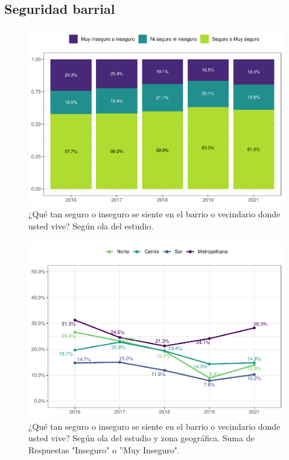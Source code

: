 \documentclass[
  12pt,
]{book}
\begin{document}
\hypertarget{seguridad-barrial}{%
\subsection{Seguridad barrial}\label{seguridad-barrial}}

\begin{figure}

{\centering \includegraphics{reporte-elsoc_files/figure-latex/seguri-ola-1} 

}

\caption{¿Qué tan seguro o inseguro se siente en el barrio o vecindario donde usted vive? Según ola del estudio.}\label{fig:seguri-ola}
\end{figure}

\begin{figure}

{\centering \includegraphics{reporte-elsoc_files/figure-latex/seguri-zona-1} 

}

\caption{¿Qué tan seguro o inseguro se siente en el barrio o vecindario donde usted vive? Según ola del estudio y zona geográfica. Suma de Respuestas "Inseguro" o ”Muy Inseguro".}\label{fig:seguri-zona}
\end{figure}
\end{document}
